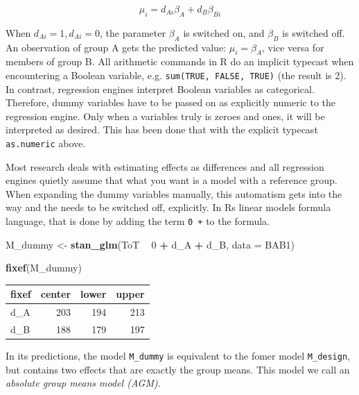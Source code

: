 \documentclass[]{svmono}
\newenvironment{Shaded}{\begin{snugshade}}{\end{snugshade}}
\newcommand{\KeywordTok}[1]{\textcolor[rgb]{0.13,0.29,0.53}{\textbf{#1}}}
\newcommand{\DataTypeTok}[1]{\textcolor[rgb]{0.13,0.29,0.53}{#1}}
\newcommand{\DecValTok}[1]{\textcolor[rgb]{0.00,0.00,0.81}{#1}}
\newcommand{\StringTok}[1]{\textcolor[rgb]{0.31,0.60,0.02}{#1}}
\newcommand{\OperatorTok}[1]{\textcolor[rgb]{0.81,0.36,0.00}{\textbf{#1}}}
\newcommand{\NormalTok}[1]{#1}
\theoremstyle{definition}
\theoremstyle{definition}
\theoremstyle{definition}
\theoremstyle{remark}
\begin{document}
\[ 
\mu_i = d_{Ai} \beta_{A} + d_B \beta_{Bi} 
\]

When \(d_{Ai}=1, d_{Ai}=0\), the parameter \(\beta_A\) is switched on,
and \(\beta_B\) is switched off. An observation of group A gets the
predicted value: \(\mu_i = \beta_A\), vice versa for members of group B.
All arithmetic commands in R do an implicit typecast when encountering a
Boolean variable, e.g. \texttt{sum(TRUE,\ FALSE,\ TRUE)} (the result is
2). In contrast, regression engines interpret Boolean variables as
categorical. Therefore, dummy variables have to be passed on as
explicitly numeric to the regression engine. Only when a variables truly
is zeroes and ones, it will be interpreted as desired. This has been
done that with the explicit typecast \texttt{as.numeric} above.

Most research deals with estimating effects as differences and all
regression engines quietly assume that what you want is a model with a
reference group. When expanding the dummy variables manually, this
automatism gets into the way and the needs to be switched off,
explicitly. In Rs linear models formula language, that is done by adding
the term \texttt{0\ +} to the formula.

\begin{Shaded}
\begin{Highlighting}[]
\NormalTok{M_dummy <-}
\StringTok{  }\KeywordTok{stan_glm}\NormalTok{(ToT }\OperatorTok{~}\StringTok{ }\DecValTok{0} \OperatorTok{+}\StringTok{ }\NormalTok{d_A }\OperatorTok{+}\StringTok{ }\NormalTok{d_B, }
     \DataTypeTok{data =}\NormalTok{ BAB1)}
\end{Highlighting}
\end{Shaded}

\begin{Shaded}
\begin{Highlighting}[]
\KeywordTok{fixef}\NormalTok{(M_dummy)}
\end{Highlighting}
\end{Shaded}

\begin{longtable}[]{@{}lrrr@{}}
\toprule
fixef & center & lower & upper\tabularnewline
\midrule
\endhead
d\_A & 203 & 194 & 213\tabularnewline
d\_B & 188 & 179 & 197\tabularnewline
\bottomrule
\end{longtable}

In its predictions, the model \texttt{M\_dummy} is equivalent to the
fomer model \texttt{M\_design}, but contains two effects that are
exactly the group means. This model we call an \emph{absolute group
means model (AGM)}.
\end{document}
